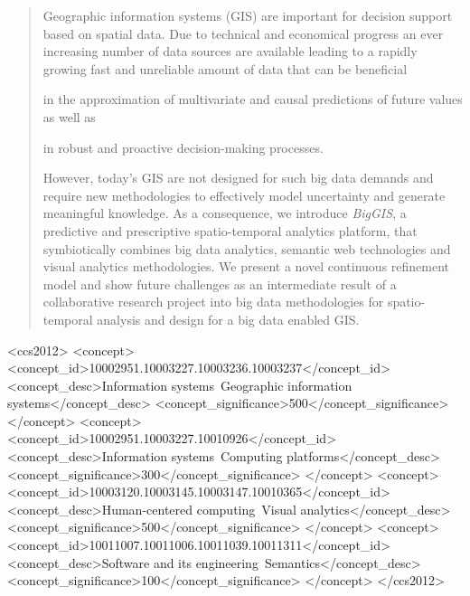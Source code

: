 \documentclass{sig-alternate-05-2015}
\begin{document}
\maketitle
\begin{abstract}
Geographic information systems (GIS) are important for decision support
based on spatial data. Due to technical and economical progress an ever
increasing number of data sources are available leading to a rapidly growing
fast and unreliable amount of data that can be beneficial
\begin{inparaenum}[(1)]
\item in the approximation of multivariate and causal predictions of future
values as well as
\item in robust and proactive decision-making processes. 
\end{inparaenum}
However, today's GIS are not designed for such big data demands and require new
methodologies to effectively model uncertainty and generate meaningful
knowledge. As a consequence, we introduce \textit{BigGIS}, a predictive and
prescriptive spatio-temporal analytics platform, that symbiotically
combines big data analytics, semantic web technologies and visual analytics
methodologies. We present a novel continuous refinement model and show future
challenges as an intermediate result of a collaborative research project into
big data methodologies for spatio-temporal analysis and design for a big data
enabled GIS.
\end{abstract}


%
%
\begin{CCSXML}
<ccs2012>
<concept>
<concept_id>10002951.10003227.10003236.10003237</concept_id>
<concept_desc>Information systems~Geographic information systems</concept_desc>
<concept_significance>500</concept_significance>
</concept>
<concept>
<concept_id>10002951.10003227.10010926</concept_id>
<concept_desc>Information systems~Computing platforms</concept_desc>
<concept_significance>300</concept_significance>
</concept>
<concept>
<concept_id>10003120.10003145.10003147.10010365</concept_id>
<concept_desc>Human-centered computing~Visual analytics</concept_desc>
<concept_significance>500</concept_significance>
</concept>
<concept>
<concept_id>10011007.10011006.10011039.10011311</concept_id>
<concept_desc>Software and its engineering~Semantics</concept_desc>
<concept_significance>100</concept_significance>
</concept>
</ccs2012>
\end{CCSXML}
\end{document}

